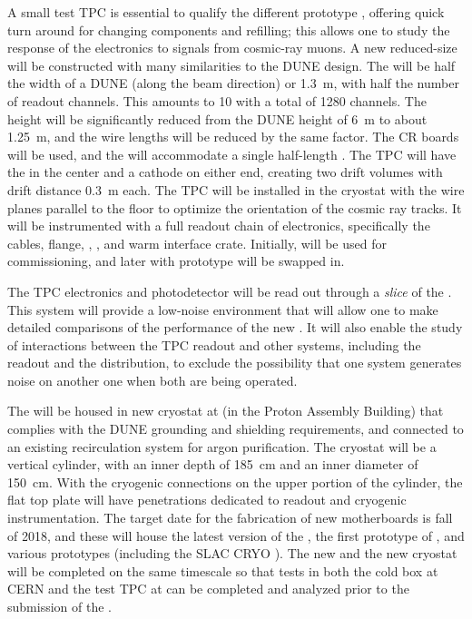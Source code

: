 A small test TPC is essential to qualify the different prototype , offering quick turn around for changing components and refilling; this allows one to study the response of the electronics to signals from cosmic-ray muons.  A new reduced-size  will be constructed with many similarities to the DUNE  design.  The  will be half the width of a DUNE  (along the beam direction) or \SI{1.3}{m}, with half the number of readout channels.  This amounts to \num{10}  with a total of \num{1280} channels.  The height will be significantly reduced from the DUNE  height of \SI{6}{m} to about \SI{1.25}{m}, and the wire lengths will be reduced by the same factor.  The  CR boards will be used, and  the  will accommodate a single half-length .  The TPC will have the  in the center and a cathode on either end, creating two drift volumes with drift distance \SI{0.3}{m} each.  The TPC will be installed in the cryostat with the wire planes parallel to the floor to optimize the orientation of the cosmic ray tracks.  It will be instrumented with a full readout chain of  electronics, specifically  the cables, \fdth flange, , , and warm interface crate.  Initially,   will be used for commissioning, and later  with prototype  will be swapped in.

The TPC electronics and photodetector will be read out through a \textit{slice} of the  .  This system will provide a low-noise environment that will allow one to make detailed comparisons of the performance of the new . It will also enable the study of interactions between the TPC readout and other systems, including the  readout and the  distribution, to exclude the possibility that one system generates noise on another one when both are being operated.
 
The  will be housed in new \lar cryostat at \fnal (in the Proton Assembly Building) that complies with the DUNE grounding and shielding requirements, and connected to an existing recirculation system for argon purification.  The cryostat will be a vertical cylinder, with an inner depth of \SI{185}{cm} and an inner diameter of \SI{150}{cm}.  With the cryogenic connections on the upper portion of the cylinder, the flat top plate will have penetrations dedicated to readout and cryogenic instrumentation.  The target date for the fabrication of new  motherboards is fall of 2018, and these will house the latest version of the  , the first prototype of , and various  prototypes (including the SLAC CRYO ).  The new  and the new cryostat will be completed on the same timescale so that tests in both the  cold box at CERN and the test TPC at \fnal can be completed and analyzed prior to the submission of the .  
